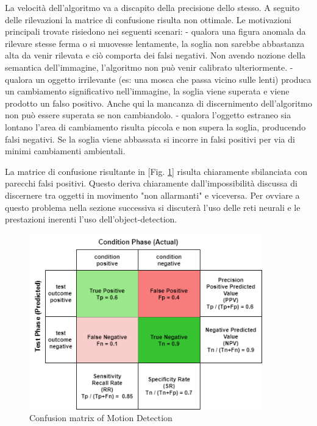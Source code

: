     La velocità dell'algoritmo va a discapito della precisione dello stesso. A seguito delle rilevazioni la matrice di confusione risulta non ottimale. Le motivazioni principali trovate risiedono nei seguenti scenari:
    - qualora una figura anomala da rilevare stesse ferma o si muovesse lentamente, la soglia non sarebbe abbastanza alta da venir rilevata e ciò comporta dei falsi negativi. Non avendo nozione della semantica dell'immagine, l'algoritmo non può venir calibrato ulteriormente.
    - qualora un oggetto irrilevante (es: una mosca che passa vicino sulle lenti) produca un cambiamento significativo nell'immagine, la soglia viene superata e viene prodotto un falso positivo. Anche qui la mancanza di discernimento dell'algoritmo non può essere superata se non cambiandolo.
    - qualora l'oggetto estraneo sia lontano l'area di cambiamento risulta piccola e non supera la soglia, producendo falsi negativi. Se la soglia viene abbassata si incorre in falsi positivi per via di minimi cambiamenti ambientali.
    
    La matrice di confusione risultante in [Fig. \ref{fig:MDmatrix}] risulta chiaramente sbilanciata con parecchi falsi positivi. Questo deriva chiaramente dall'impossibilità discussa di discernere tra oggetti in movimento "non allarmanti" e viceversa.
    Per ovviare a questo problema nella sezione successiva si discuterà l'uso delle reti neurali e le prestazioni inerenti l'uso dell'object-detection.
    \begin{figure}[H]
        \caption{Confusion matrix of Motion Detection}
        \label{fig:MDmatrix}
        \centering
        \includegraphics[width=0.9\textwidth]{DrawIo/ConfusionMatrixMotDet.png}
    \end{figure}


